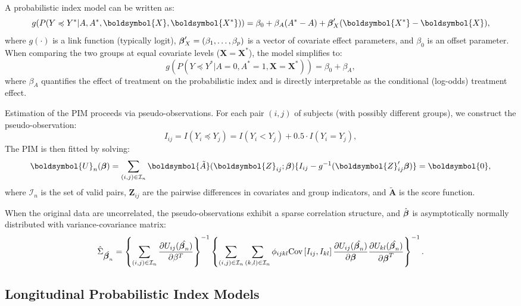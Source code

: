 \documentclass[alpha-refs]{wiley-article}
\newcommand{\mb}[1]
   {\boldsymbol{#1}}
\newcommand{\cov}[1]
  {\mbox{Cov}\left[#1\right]}
\newcommand{\bbeta}{\mbox{\boldmath$\beta$}}
\begin{document}
A probabilistic index model can be written as:
\begin{equation}
  g(P(Y \preccurlyeq Y^* | A,A^*,\mb{X},\mb{X^*} ))  = \beta_0 + \beta_A (A^* - A) +  \bbeta'_{X} (\mb{X^*} - \mb{X}),
\label{final_PIM}  
\end{equation}
where $g(\cdot)$ is a link function (typically logit), $\bbeta_{X}' = (\beta_1, \ldots, \beta_p)$ is a vector of covariate effect parameters, and $\beta_0$ is an offset parameter. When comparing the two groups at equal covariate levels ($\mb{X} = \mb{X}^*$), the model simplifies to:
\begin{equation}
  g(P(Y \preccurlyeq Y^* | A=0, A^*=1,\mb{X}=\mb{X^*} ))  = \beta_0 + \beta_A,
\label{final_PIM2}  
\end{equation}
where $\beta_A$ quantifies the effect of treatment on the probabilistic index and is directly interpretable as the conditional (log-odds) treatment effect.

Estimation of the PIM proceeds via pseudo-observations. For each pair $(i,j)$ of subjects (with possibly different groups), we construct the pseudo-observation:
\[
I_{ij} = I(Y_i \preccurlyeq Y_j) = I(Y_i < Y_j) + 0.5 \cdot I(Y_i = Y_j),
\]
The PIM is then fitted by solving:
\begin{equation}
\label{est_eq}
\boldsymbol{U}_n(\bbeta) = \sum_{(i,j) \in \mathcal{I}_n}{\boldsymbol{\tilde{A}}(\boldsymbol{Z}_{ij};\bbeta)\{ I_{ij} - g^{-1}(\boldsymbol{Z}'_{ij}\bbeta) \} } = \boldsymbol{0},    
\end{equation}
where $\mathcal{I}_n$ is the set of valid pairs, $\boldsymbol{Z}_{ij}$ are the pairwise differences in covariates and group indicators, and $\boldsymbol{\tilde{A}}$ is the score function.

When the original data are uncorrelated, the pseudo-observations exhibit a sparse correlation structure, and $\hat{\bbeta}$ is asymptotically normally distributed with variance-covariance matrix:
\begin{equation}
\label{PIM:vcoc}
    \hat{\Sigma}_{\hat{\bbeta_n}}= \left\{  \sum_{(i,j)\in \mathcal{I}_n}{\frac{\partial U_{ij}(\hat{\bbeta_n})}{\partial\beta^T}} \right\}^{-1}  \left\{ \sum_{(i,j)\in \mathcal{I}_n} \sum_{(k,l)\in \mathcal{I}_n} \phi_{ijkl} \cov{I_{ij}, I_{kl}} \frac{\partial U_{ij}(\hat{\bbeta_n})}{\partial \bbeta} \frac{\partial U_{kl}(\hat{\bbeta_n})}{\partial \bbeta^T} \right\}^{-1}.
\end{equation}

\subsection{Longitudinal Probabilistic Index Models}
\end{document}
